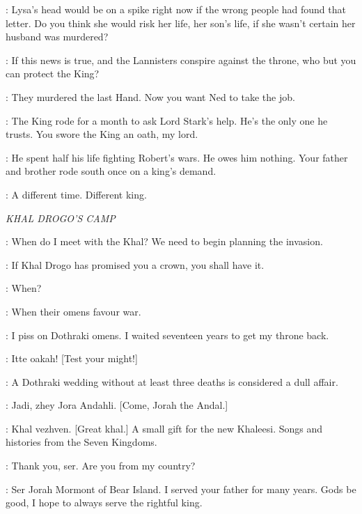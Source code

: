 \CATELYN: Lysa's head would be on a spike right now if the wrong people had found that letter. Do you think she would risk her life, her son's life, if she wasn't certain her husband was murdered? 

\LUWIN: If this news is true, and the Lannisters conspire against the throne, who but you can protect the King? 

\CATELYN: They murdered the last Hand. Now you want Ned to take the job. 

\LUWIN: The King rode for a month to ask Lord Stark's help. He's the only one he trusts. You swore the King an oath, my lord. 

\CATELYN: He spent half his life fighting Robert's wars. He owes him nothing.  Your father and brother rode south once on a king's demand. 

\LUWIN: A different time. Different king. 


\scene

\textit{KHAL DROGO'S CAMP} 


\VISERYS: When do I meet with the Khal? We need to begin planning the invasion. 

\ILLYRIO: If Khal Drogo has promised you a crown, you shall have it. 

\VISERYS: When? 

\ILLYRIO: When their omens favour war. 

\VISERYS: I piss on Dothraki omens. I waited seventeen years to get my throne back. 

\DROGO: Itte oakah! [Test your might!]


\ILLYRIO: A Dothraki wedding without at least three deaths is considered a dull affair. 


\DROGO: Jadi, zhey Jora Andahli. [Come, Jorah the Andal.]

\JORAH: Khal vezhven. [Great khal.] A small gift for the new Khaleesi. Songs and histories from the Seven Kingdoms. 

\DAENERYS: Thank you, ser. Are you from my country? 

\JORAH: Ser Jorah Mormont of Bear Island. I served your father for many years. Gods be good, I hope to always serve the rightful king. 

